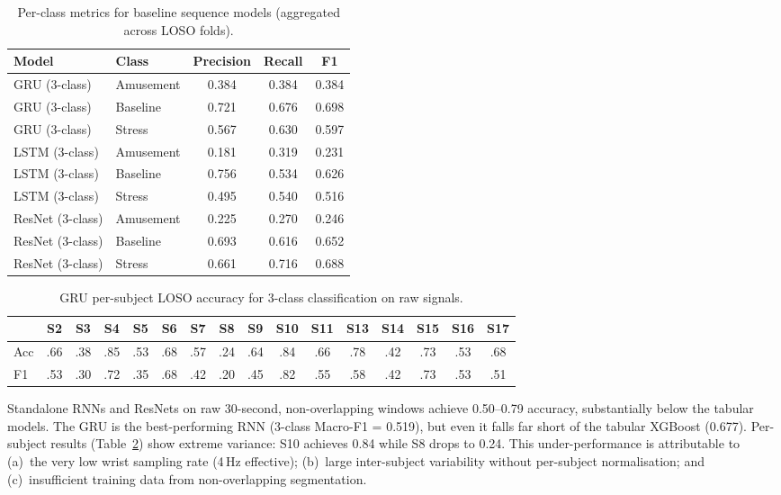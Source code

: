 \documentclass[11pt]{article}
\begin{document}
\begin{table}[H]
\centering
\caption{Per-class metrics for baseline sequence models (aggregated across LOSO folds).}
\label{tab:baseline-seq-perclass}
\begin{tabular}{llccc}
\toprule
\textbf{Model} & \textbf{Class} & \textbf{Precision} & \textbf{Recall} & \textbf{F1} \\
\midrule
GRU (3-class)    & Amusement  & 0.384 & 0.384 & 0.384 \\
GRU (3-class)    & Baseline   & 0.721 & 0.676 & 0.698 \\
GRU (3-class)    & Stress     & 0.567 & 0.630 & 0.597 \\
\midrule
LSTM (3-class)   & Amusement  & 0.181 & 0.319 & 0.231 \\
LSTM (3-class)   & Baseline   & 0.756 & 0.534 & 0.626 \\
LSTM (3-class)   & Stress     & 0.495 & 0.540 & 0.516 \\
\midrule
ResNet (3-class) & Amusement  & 0.225 & 0.270 & 0.246 \\
ResNet (3-class) & Baseline   & 0.693 & 0.616 & 0.652 \\
ResNet (3-class) & Stress     & 0.661 & 0.716 & 0.688 \\
\bottomrule
\end{tabular}
\end{table}

\begin{table}[H]
\centering
\caption{GRU per-subject LOSO accuracy for 3-class classification on raw signals.}
\label{tab:gru-persub}
\small
\begin{tabular}{lccccccccccccccc}
\toprule
& S2 & S3 & S4 & S5 & S6 & S7 & S8 & S9 & S10 & S11 & S13 & S14 & S15 & S16 & S17 \\
\midrule
Acc & .66 & .38 & .85 & .53 & .68 & .57 & .24 & .64 & .84 & .66 & .78 & .42 & .73 & .53 & .68 \\
F1  & .53 & .30 & .72 & .35 & .68 & .42 & .20 & .45 & .82 & .55 & .58 & .42 & .73 & .53 & .51 \\
\bottomrule
\end{tabular}
\end{table}

Standalone RNNs and ResNets on raw 30-second, non-overlapping windows achieve 0.50--0.79 accuracy, substantially below the tabular models.
The GRU is the best-performing RNN (3-class Macro-F1 = 0.519), but even it falls far short of the tabular XGBoost (0.677).
Per-subject results (Table~\ref{tab:gru-persub}) show extreme variance: S10 achieves 0.84 while S8 drops to 0.24.
This under-performance is attributable to (a)~the very low wrist sampling rate (4\,Hz effective); (b)~large inter-subject variability without per-subject normalisation; and (c)~insufficient training data from non-overlapping segmentation.
\end{document}
